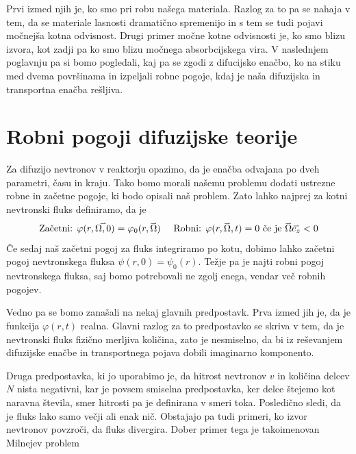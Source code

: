 \documentclass[slovene,11pt,a4paper]{article}
\def\phi{\varphi}
\renewcommand{\vec}[1]{\overset{\smash{\hbox{\raise -0.42ex\hbox{$\scriptscriptstyle\rightharpoonup$}}}}{#1}}
\begin{document}
Prvi izmed njih je, ko smo pri robu našega materiala. Razlog za to pa se nahaja v tem, da se materiale lasnosti dramatično spremenijo in s tem se tudi pojavi močnejša kotna odvisnost. Drugi primer močne kotne odvisnosti je, ko smo blizu izvora, kot zadji pa ko smo blizu močnega absorbcijskega vira. V naslednjem poglavnju pa si bomo pogledali, kaj pa se zgodi z difucijsko enačbo, ko na stiku med dvema površinama in izpeljali robne pogoje, kdaj je naša difuzijska in transportna enačba rešljiva.

\section{Robni pogoji difuzijske teorije}
Za difuzijo nevtronov v reaktorju opazimo, da je enačba odvajana po dveh parametri, času in kraju. Tako bomo morali našemu problemu dodati ustrezne robne in začetne pogoje, ki bodo opisali naš problem. Zato lahko najprej za kotni nevtronski fluks definiramo, da je 
\begin{equation}
    \text{Začetni: } \phi(r,\vec{\Omega, 0})=\phi_0(r,\vec{\Omega}) \quad \text{ Robni: } \phi(r,\vec{\Omega},t)=0 \text{ če je } \vec{\Omega}\vec{e_z}<0
\end{equation}
Če sedaj naš začetni pogoj za fluks integriramo po kotu, dobimo lahko začetni pogoj nevtronskega fluksa $\psi(r,0)=\psi_0(r)$. Težje pa je najti robni pogoj nevtronskega fluksa, saj bomo potrebovali ne zgolj enega, vendar več robnih pogojev.


Vedno pa se bomo zanašali na nekaj glavnih predpostavk. Prva izmed jih je, da je funkcija $\phi(r,t)$ realna. Glavni razlog za to predpostavko se skriva v tem, da je nevtronski fluks fizično merljiva količina, zato je nesmiselno, da bi iz reševanjem difuzijske enačbe in transportnega pojava dobili imaginarno komponento. 


Druga predpostavka, ki jo uporabimo je, da hitrost nevtronov $v$ in količina delcev $N$ nista negativni, kar je povsem smiselna predpostavka, ker delce štejemo kot naravna števila, smer hitrosti pa je definirana v smeri toka. Posledično sledi, da je fluks lako samo večji ali enak nič. Obstajajo pa tudi primeri, ko izvor nevtronov povzroči, da fluks divergira. Dober primer tega je takoimenovan Milnejev problem
\end{document}
